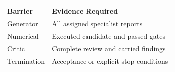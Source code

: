 \begin{tabular}{@{}P{4.0cm}P{8.5cm}@{}}
\toprule
\textbf{Barrier} & \textbf{Evidence Required} \\
\midrule
Generator & All assigned specialist reports \\
Numerical & Executed candidate and passed gates \\
Critic & Complete review and carried findings \\
Termination & Acceptance or explicit stop conditions \\
\bottomrule
\end{tabular}

